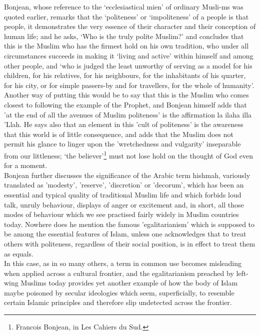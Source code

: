 \documentclass[10pt, twoside]{book}
\begin{document}
Bonjean, whose reference to the `ecclesiastical mien' of ordinary Musli\hyp{}ms was quoted earlier, remarks 
that the `politeness' or `impoliteness' of a people is that people, it demonstrates the very essence 
of their character and their conception of human life; and he asks, `Who is the truly polite Muslim?' 
and concludes that this is the Muslim who has the firmest hold on his own tradition, who under all 
circumstances succeeds in making it `living and active' within himself and among other people, and 
`who is judged the least unworthy of serving as a model for his children, for his relatives, for his 
neighbours, for the inhabitants of his quarter, for his city, or for simple passers\hyp{}by and for 
travellers, for the whole of humanity'. Another way of putting this would be to say that this is the 
Muslim who comes closest to following the example of the Prophet, and Bonjean himself adds that 'at 
the end of all the avenues of Muslim politeness' is the affirmation la ilaha illa 'Llah. He says also 
that an element in this 'cult of politeness' is the awareness that this world is of little 
consequence, and adds that the Muslim does not permit his glance to linger upon the 'wretchedness and 
vulgarity' inseparable from our littleness; `the believer'\footnote{Francois Bonjean, in Les Cahiers du Sud.} must not lose hold on the thought of God even for a moment. \\

Bonjean further discusses the significance of the Arabic term hishmah, variously translated as 
'modesty', 'reserve', 'discretion' or 'decorum', which has been an essential and typical quality of 
traditional Muslim life and which forbids loud talk, unruly behaviour, displays of anger or 
excitement and, in short, all those modes of behaviour which we see practised fairly widely in Muslim 
countries today. Nowhere does he mention the famous 'egalitarianism' which is supposed to be among 
the essential features of Islam, unless one acknowledges that to treat others with politeness, 
regardless of their social position, is in effect to treat them as equals. \\

In this case, as in so many others, a term in common use becomes misleading when applied across a 
cultural frontier, and the egalitarianism preached by left\hyp{}wing Muslims today provides yet another 
example of how the body of Islam maybe poisoned by secular ideologies which seem, superficially, to 
resemble certain Islamic principles and therefore slip undetected across the frontier. \\
\end{document}
